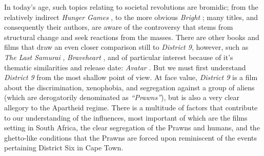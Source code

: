 \documentclass[10pt, letterpaper]{article}
\theoremstyle{definition}
\begin{document}
	In today's age, such topics relating to societal revolutions are bromidic; from the relatively indirect \emph{Hunger Games} \autocite{hunger_games}, to the more obvious \emph{Bright} \autocite{bright}; many titles, and consequently their authors, are aware of the controversy that stems from structural change and seek reactions from the masses. There are other books and films that draw an even closer comparison still to \emph{District 9}, however, such as \emph{The Last Samurai} \autocite{the_last_samurai}, \emph{Braveheart} \autocite{braveheart}, and of particular interest because of it's thematic similarities and release date: \emph{Avatar} \autocite{avatar}. But we must first understand \emph{District 9} from the most shallow point of view. At face value, \emph{District 9} is a film about the discrimination, xenophobia, and segregation against a group of aliens (which are derogatorily denominated as \emph{``Prawns''}), but is also a very clear allegory to the Apartheid \autocite{apartheid} regime. There is a multitude of factors that contribute to our understanding of the influences, most important of which are the films setting in South Africa, the clear segregation of the Prawns and humans, and the ghetto-like conditions that the Prawns are forced upon reminiscent of the events pertaining District Six in Cape Town.
	
\end{document}
